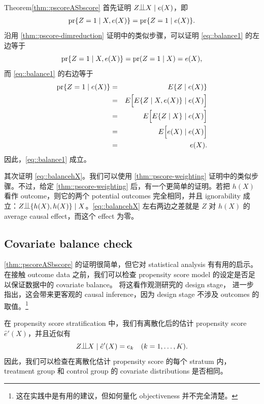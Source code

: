 \begin{myproof}{Theorem}{\cref{thm::pscoreASbscore}}
首先证明 $Z\ind X \mid e(X)$，即
\begin{eqnarray}
\textup{pr}\{Z=1\mid X, e(X)\} = \textup{pr}\{Z=1\mid  e(X)\}.
\label{eq::balance1}
\end{eqnarray} 
沿用 \cref{thm::pscore-dimreduction} 证明中的类似步骤，可以证明 \eqref{eq::balance1} 的左边等于
$$
\textup{pr}\{Z=1\mid X, e(X)\} = \textup{pr}( Z=1\mid X ) = e(X),
$$
而 \eqref{eq::balance1} 的右边等于
\begin{eqnarray*}
\textup{pr}\{Z=1\mid  e(X)\} &=& E\{  Z\mid  e(X) \}  \\
&=& E\Big[ E\{  Z\mid X,  e(X) \} \mid e(X) \Big] \\
&=& E\Big[ E\{  Z\mid X  \} \mid e(X) \Big] \\
&=& E\Big[ e(X) \mid e(X) \Big] \\
&=& e(X). 
\end{eqnarray*}
因此，\eqref{eq::balance1} 成立。

其次证明 \eqref{eq::balancehX}。我们可以使用 \cref{thm::pscore-weighting} 证明中的类似步骤。不过，给定 \cref{thm::pscore-weighting} 后，有一个更简单的证明。若把 $h(X)$ 看作 outcome，则它的两个 potential outcomes 完全相同，并且 ignorability 成立：$Z\ind \{  h(X), h(X) \}  \mid X$。\eqref{eq::balancehX} 左右两边之差就是 $Z$ 对 $h(X)$ 的 average causal effect，而这个 effect 为零。
\end{myproof}





\subsection{Covariate balance check}
\label{sec::balance-check-bmi}

\cref{thm::pscoreASbscore} 的证明很简单，但它对 statistical analysis 有有用的启示。在接触 outcome data 之前，我们可以检查 propensity score model 的设定是否足以保证数据中的 covariate balance。\citet{rubin2007design} 将这看作观测研究的 design stage，\citet{rubin2008objective} 进一步指出，这会带来更客观的 causal inference，因为 design stage 不涉及 outcomes 的取值。\footnote{这在实践中是有用的建议，但如何量化 objectiveness 并不完全清楚。}


在 propensity score stratification 中，我们有离散化后的估计 propensity score $\hat{e}'(X)$，并且近似有
$$
Z\ind X\mid \hat{e}'(X) = e_k\quad (k=1,\ldots, K).
$$
因此，我们可以检查在离散化估计 propensity score 的每个 stratum 内，treatment group 和 control group 的 covariate distributions 是否相同。



